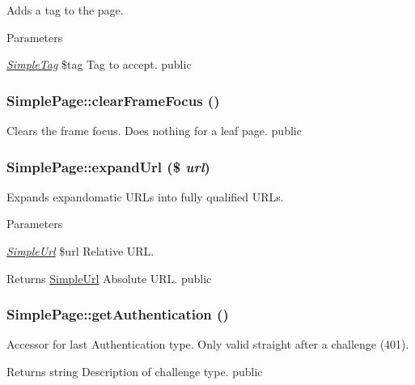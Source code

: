 \label{class_simple_page_a3ce47573a8bab24b30b3c49726dfb2d6}
Adds a tag to the page. 
\begin{DoxyParams}{Parameters}
\item[{\em \hyperlink{class_simple_tag}{SimpleTag}}]\$tag Tag to accept.  public \end{DoxyParams}
\hypertarget{class_simple_page_adc6aac5383cb44f0f9ab39f17bce17d1}{
\subsubsection[{clearFrameFocus}]{\setlength{\rightskip}{0pt plus 5cm}SimplePage::clearFrameFocus ()}}
\label{class_simple_page_adc6aac5383cb44f0f9ab39f17bce17d1}
Clears the frame focus. Does nothing for a leaf page.  public \hypertarget{class_simple_page_a1869ffc12c864603ecf18c0d07466e95}{
\subsubsection[{expandUrl}]{\setlength{\rightskip}{0pt plus 5cm}SimplePage::expandUrl (\$ {\em url})}}
\label{class_simple_page_a1869ffc12c864603ecf18c0d07466e95}
Expands expandomatic URLs into fully qualified URLs. 
\begin{DoxyParams}{Parameters}
\item[{\em \hyperlink{class_simple_url}{SimpleUrl}}]\$url Relative URL. \end{DoxyParams}
\begin{DoxyReturn}{Returns}
\hyperlink{class_simple_url}{SimpleUrl} Absolute URL.  public 
\end{DoxyReturn}
\hypertarget{class_simple_page_a043db55e5e4baa59bdb55636b28ae1c5}{
\subsubsection[{getAuthentication}]{\setlength{\rightskip}{0pt plus 5cm}SimplePage::getAuthentication ()}}
\label{class_simple_page_a043db55e5e4baa59bdb55636b28ae1c5}
Accessor for last Authentication type. Only valid straight after a challenge (401). \begin{DoxyReturn}{Returns}
string Description of challenge type.  public 
\end{DoxyReturn}
